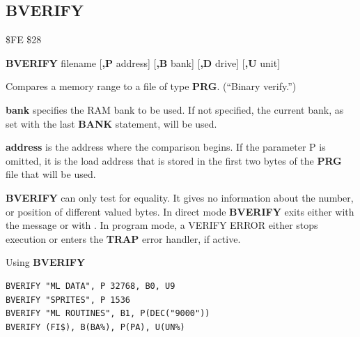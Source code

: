 
\newpage
\subsection{BVERIFY}
\begin{description}[leftmargin=2cm,style=nextline]
\item [Token:] \$FE \$28
\item [Format:] {\bf BVERIFY} filename [{\bf,P} address]
                [{\bf,B} bank] [{\bf,D} drive] [{\bf,U} unit]
\item [Usage:]
   Compares a memory range to
   a file of type {\bf PRG}. (``Binary verify.'')

   \filenamedefinition

   {\bf bank} specifies the RAM bank to be used.
   If not specified, the current bank, as set with the last
   {\bf BANK} statement, will be used.

   {\bf address} is the address where the comparison begins.
   If the parameter P is omitted, it is the load address
   that is stored in the first two bytes of the {\bf PRG} file that will be used.

   \drivedefinition

   \unitdefinition

\item [Remarks:]
   {\bf BVERIFY} can only test for equality. It gives no information
   about the number, or position of different valued bytes.
   In direct mode {\bf BVERIFY} exits either with the message 
   or with . In program mode, a VERIFY ERROR
   either stops execution or enters the {\bf TRAP} error handler,
   if active.

\item [Examples:] Using {\bf BVERIFY}
\begin{tcolorbox}[colback=black,coltext=white]
\verbatimfont{\codefont}
\begin{verbatim}
BVERIFY "ML DATA", P 32768, B0, U9
BVERIFY "SPRITES", P 1536
BVERIFY "ML ROUTINES", B1, P(DEC("9000"))
BVERIFY (FI$), B(BA%), P(PA), U(UN%)
\end{verbatim}
\end{tcolorbox}
\end{description}



\newpage
